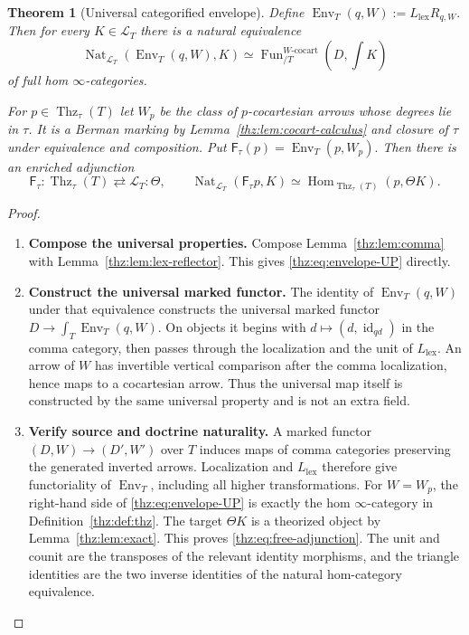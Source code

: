 \documentclass[oneside]{article}
\theoremstyle{plain}
\newtheorem{theorem}{Theorem}[section]
\theoremstyle{definition}
\theoremstyle{remark}
\newcommand{\Env}{\operatorname{Env}}
\newcommand{\Fun}{\operatorname{Fun}}
\newcommand{\Nat}{\operatorname{Nat}}
\newcommand{\Thz}{\operatorname{Thz}}
\newcommand{\coc}{\mathrm{cocart}}
\newcommand{\id}{\operatorname{id}}
\begin{document}
\begin{theorem}[Universal categorified envelope]\label{thz:thm:envelope}
Define $\Env_T(q,W):=L_{\mathrm{lex}}R_{q,W}.$ Then for every $K\in\mathcal L_T$ there is a natural equivalence
\begin{equation}\label{thz:eq:envelope-UP}
 \Nat_{\mathcal L_T}(\Env_T(q,W),K)
 \simeq
 \Fun^{W\text{-}\coc}_{/T}
   (D,\textstyle\int K)
\end{equation}
of full hom $\infty$-categories.

For $p\in\Thz_\tau(T)$ let $W_p$ be the class of $p$-cocartesian
arrows whose degrees lie in $\tau$.  It is a Berman marking by
Lemma~\ref{thz:lem:cocart-calculus} and closure of $\tau$ under equivalence
and composition.  Put $\mathsf F_\tau(p)=\Env_T(p,W_p).$ Then there is an enriched adjunction
\begin{equation}\label{thz:eq:free-adjunction}
 \mathsf F_\tau:\Thz_\tau(T)
 \rightleftarrows\mathcal L_T:\Theta,
 \qquad
 \Nat_{\mathcal L_T}(\mathsf F_\tau p,K)
 \simeq
 \operatorname{Hom}_{\Thz_\tau(T)}(p,\Theta K).
\end{equation}
\end{theorem}
\begin{proof}
\leavevmode
\begin{enumerate}
\item \textbf{Compose the universal properties.} Compose Lemma~\ref{thz:lem:comma} with
Lemma~\ref{thz:lem:lex-reflector}.  This gives
\eqref{thz:eq:envelope-UP} directly.
\item \textbf{Construct the universal marked functor.} The identity of $\Env_T(q,W)$ under that equivalence constructs the
universal marked functor $D\longrightarrow\int_T\Env_T(q,W).$ On objects it begins with
$d\mapsto(d,\id_{qd})$ in the comma category, then passes through the
localization and the unit of $L_{\mathrm{lex}}$.  An arrow of $W$ has
invertible vertical comparison after the comma localization, hence maps
to a cocartesian arrow.  Thus the universal map itself is constructed by
the same universal property and is not an extra field.
\item \textbf{Verify source and doctrine naturality.} A marked functor $(D,W)\to(D',W')$ over $T$ induces maps of comma
categories preserving the generated inverted arrows.  Localization and
$L_{\mathrm{lex}}$ therefore give functoriality of $\Env_T$, including
all higher transformations.  For $W=W_p$, the right-hand side of
\eqref{thz:eq:envelope-UP} is exactly the hom $\infty$-category in
Definition~\ref{thz:def:thz}.  The target $\Theta K$ is a theorized object
by Lemma~\ref{thz:lem:exact}.  This proves
\eqref{thz:eq:free-adjunction}.  The unit and counit are the transposes of
the relevant identity morphisms, and the triangle identities are the two
inverse identities of the natural hom-category equivalence.\qedhere
\end{enumerate}
\end{proof}
\end{document}
